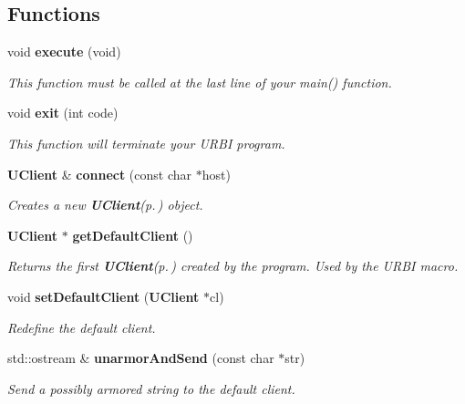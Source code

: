 \subsection*{Functions}
\begin{CompactItemize}
\item 
void {\bf execute} (void)\label{namespaceurbi_a5}

\begin{CompactList}\small\item\em This function must be called at the last line of your main() function. \item\end{CompactList}\item 
void {\bf exit} (int code)\label{namespaceurbi_a6}

\begin{CompactList}\small\item\em This function will terminate your URBI program. \item\end{CompactList}\item 
{\bf UClient} \& {\bf connect} (const char $\ast$host)\label{namespaceurbi_a7}

\begin{CompactList}\small\item\em Creates a new {\bf UClient}{\rm (p.\,\pageref{classUClient})} object. \item\end{CompactList}\item 
{\bf UClient} $\ast$ {\bf get\-Default\-Client} ()\label{namespaceurbi_a8}

\begin{CompactList}\small\item\em Returns the first {\bf UClient}{\rm (p.\,\pageref{classUClient})} created by the program. Used by the URBI macro. \item\end{CompactList}\item 
void {\bf set\-Default\-Client} ({\bf UClient} $\ast$cl)\label{namespaceurbi_a9}

\begin{CompactList}\small\item\em Redefine the default client. \item\end{CompactList}\item 
std::ostream \& {\bf unarmor\-And\-Send} (const char $\ast$str)\label{namespaceurbi_a10}

\begin{CompactList}\small\item\em Send a possibly armored string to the default client. \item\end{CompactList}\end{CompactItemize}


